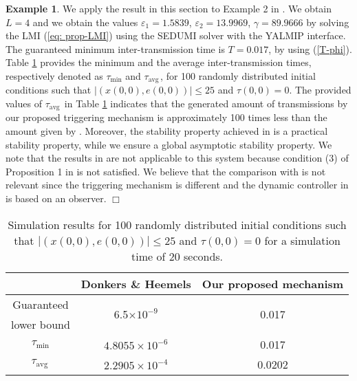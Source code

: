 \documentclass[a4paper, 9pt, twocolumn]{IEEEtran}
\theoremstyle{plain}
\theoremstyle{definition}
\newtheorem{exmple}{Example}
\newcommand{\avg}{\ensuremath{\text{avg}\,}}
\begin{document}
\begin{exmple}\label{sec: illutrative-example}
We apply the result in this section to Example 2 in \cite{Donkers2012output}. We obtain $L = 4$ and we obtain the values $\varepsilon_{1} = 1.5839$, $\varepsilon_{2}=13.9969$, $\gamma = 89.9666$ by solving the LMI (\ref{eq: prop-LMI}) using the SEDUMI solver with the YALMIP interface. The guaranteed minimum inter-transmission time is $T = 0.017$, by using (\ref{T-phi}). Table \ref{tbl:linear-out-emulation} provides the minimum and the average inter-transmission times, respectively denoted as $\tau_{\min}$ and $\tau_{\avg}$, for 100 randomly distributed initial conditions such that $|(x(0,0),e(0,0))|\leq 25$ and $\tau(0,0)=0$.  The provided values of $\tau_{\avg}$ in Table \ref{tbl:linear-out-emulation} indicates that the generated amount of transmissions by our proposed triggering mechanism is approximately 100 times less than the amount given by \cite{Donkers2012output}. Moreover, the stability property achieved in \cite{Donkers2012output} is a practical stability property, while we ensure a global asymptotic stability property. We note that the results in \cite{Yu2012event} are not applicable to this system because condition (3) of Proposition 1 in \cite{Yu2012event} is not satisfied. We believe that the comparison with \cite{Tallapragada2012event-CDC} is not relevant since the triggering mechanism is different and the dynamic controller in \cite{Tallapragada2012event-CDC} is based on an observer.
\hfill $\Box$



\begin{table}[H]
\begin{center}
\begin{tabular}{ c | c | c }
            & Donkers \& Heemels \cite{Donkers2012output}  & Our proposed mechanism \\ \hline
  Guaranteed & \multirow{2}{*}{6.5$\times 10^{-9}$}  &  \multirow{2}{*}{0.017}      \\
  lower bound & & \\ \hline
   $\tau_{\min}$ & $4.8055\times10^{-6}$  &  0.017 \\ \hline
   $\tau_{\avg}$ & $2.2905\times10^{-4}$  & 0.0202
  \end{tabular}
  \caption{Simulation results for 100 randomly distributed initial conditions such that $|(x(0,0),e(0,0))|\leq 25$ and $\tau(0,0)=0$ for a simulation time of 20 seconds.}
  \label{tbl:linear-out-emulation}
\end{center}
\end{table}
\end{exmple}
\end{document}
